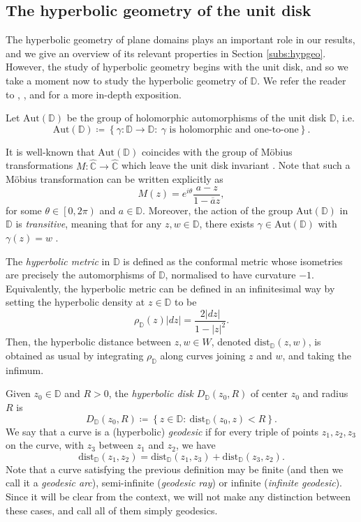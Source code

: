 \documentclass[11pt,a4paper,reqno]{amsart}
\theoremstyle{plain}
\theoremstyle{definition}
\theoremstyle{plain}
\def\DD{\mathbb{D}}
\begin{document}
\subsection{The hyperbolic geometry of the unit disk}\label{ssec:hypdisc}
The hyperbolic geometry of plane domains plays an important role in our results, and we give an overview of its relevant properties in Section \ref{subs:hypgeo}. However, the study of hyperbolic geometry begins with the unit disk, and so we take a moment now to study the hyperbolic geometry of $\DD$. We refer the reader to \cite[Chap. 1]{Aba23}, \cite[Chap. 2]{Hub06}, and \cite[Chap. 2]{KeenLakic} for a more in-depth exposition.

Let $ \textrm{Aut}(\mathbb{D}) $ be the group of holomorphic automorphisms of the unit disk $ \mathbb{D} $, i.e.
\[\textrm{Aut}(\mathbb{D})\coloneqq \left\lbrace \gamma\colon\mathbb{D}\to \mathbb{D}\colon \ \gamma \textrm{ is holomorphic and one-to-one} \right\rbrace. \]

It is well-known that $ \textrm{Aut}(\mathbb{D}) $ coincides with the group of Möbius transformations $ M\colon\widehat{\mathbb{C}}\to\widehat{\mathbb{C}} $ which leave the unit disk invariant \cite[Prop. 1.1.5]{Aba23}. Note that such a Möbius transformation can be written explicitly as \[M(z)=e^{i\theta}\dfrac{a-z}{1-\overline{a}z}, \]for some $ \theta\in \left[ 0, 2\pi\right)  $ and $ a\in\mathbb{D} $. Moreover, the action of the group $ \textrm{Aut}(\mathbb{D}) $ in $ \mathbb{D} $ is {\em transitive}, meaning that for any  $ z,w\in \mathbb{D} $, there exists $\gamma \in \textrm{Aut}(\mathbb{D})  $ with $ \gamma (z)=w $  \cite[Corol. 1.1.9]{Aba23}.

The {\em hyperbolic metric} in $ \mathbb{D} $ is defined as the conformal metric whose isometries are precisely the automorphisms of $ \mathbb{D} $, normalised to have curvature $-1$. Equivalently, the hyperbolic metric can be defined in an infinitesimal way by setting the hyperbolic density at $ z\in\mathbb{D} $ to be
 \[  \rho_\mathbb{D}(z)|dz| = \dfrac{2|dz|}{1-\left| z\right| ^2}.\]
Then, the hyperbolic distance between $ z,w\in W $, denoted $\textrm{dist}_\DD(z,w) $, is obtained as usual by integrating $ \rho_\mathbb{D}$ along curves joining $ z $ and $ w $, and taking the infimum.

Given $ z_0\in\mathbb{D} $ and $ R>0 $, the {\em hyperbolic disk} $ D_\mathbb{D} (z_0,R) $ of center $ z_0 $ and radius $ R $ is 
	\[D_\mathbb{D} (z_0,R)\coloneqq \left\lbrace z\in\mathbb{D}\colon \ \textrm{dist}_\DD(z_0,z)<R\right\rbrace .\]
We say that a curve is a (hyperbolic) {\em geodesic} if for every triple of points $ z_1, z_2, z_3 $ on the curve, with $ z_3 $ between $ z_1 $ and $ z_2 $, we have
\[\textrm{dist}_\mathbb{D}(z_1,z_2)= \textrm{dist}_\mathbb{D}(z_1,z_3)+\textrm{dist}_\mathbb{D}(z_3,z_2).\]
Note that a curve satisfying the previous definition may be finite (and then we call it a {\em geodesic arc}), semi-infinite ({\em geodesic ray}) or infinite ({\em infinite geodesic}). Since it will be clear from the context, we will not make any distinction between these cases, and call all of them simply geodesics.
\end{document}
